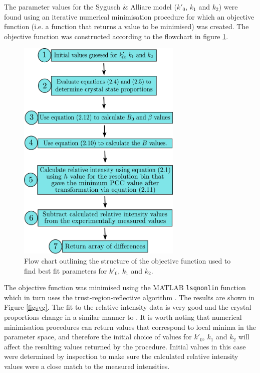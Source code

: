 The parameter values for the Sygusch \& Alliare model ($k'_0$, $k_1$ and $k_2$) were found using an iterative numerical minimisation procedure for which an objective function (i.e. a function that returns a value to be minimised) was created. The objective function was constructed according to the flowchart in figure \ref{figobjfun}.
\begin{figure}
  \centering
    \includegraphics[width=0.7\textwidth]{figures/dwd/objective_function_syg.pdf}
    \caption{Flow chart outlining the structure of the objective function used to find best fit parameters for $k'_0$, $k_1$ and $k_2$.}
    \label{figobjfun}
\end{figure}
The objective function was minimised using the MATLAB \verb+lsqnonlin+ function which in turn uses the trust-region-reflective algorithm \cite{coleman1996}.
The results are shown in Figure \ref{figsyg}.
The fit to the relative intensity data is very good and the crystal proportions change in a similar manner to \cite{owen2014}.
It is worth noting that numerical minimisation procedures can return values that correspond to local minima in the parameter space, and therefore the initial choice of values for $k'_0$, $k_1$ and $k_2$ will affect the resulting values returned by the procedure.
Initial values in this case were determined by inspection to make sure the calculated relative intensity values were a close match to the measured intensities.
